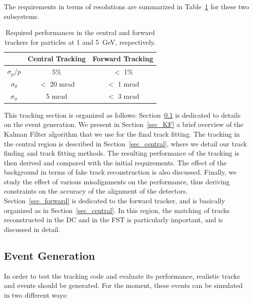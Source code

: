The requirements in terms of resolutions are summarized in 
Table~\ref{intro_requirements} for these two subsystems.

\begin{table}[ht!]
\centering
\begin{tabular}{|c|c|c|} \hline
                   & Central Tracking &  Forward Tracking \\ \hline
$\sigma_{p}/p$     & 5\%              &  $<$ 1\%     \\
$\sigma_{\theta}$  & $<$ 20 mrad      &  $<$ 1 mrad  \\
$\sigma_{\phi}$    & 5 mrad           &  $<$ 3 mrad  \\ \hline
\end{tabular}
\caption{\small{Required performances in the central and forward trackers for 
particles at 1 and 5~GeV, respectively.}}
\label{intro_requirements}
\end{table}

This tracking section is organized as follows: Section~\ref{sec_evtgener} is 
dedicated to details on the event generation.  We present in Section~\ref{sec_KF} 
a brief overview of the Kalman Filter algorithm that we use for the final track 
fitting.  The tracking in the central region is described in 
Section~\ref{sec_central}, where we detail our track finding and track fitting 
methods.  The resulting performance of the tracking is then derived and compared 
with the initial requirements. The effect of the background in terms of fake track 
reconstruction is also discussed.  Finally, we study the effect of various 
misalignments on the performance, thus deriving constraints on the accuracy of the 
alignment of the detectors.  Section~\ref{sec_forward} is dedicated to the forward 
tracker, and is basically organized as in Section~\ref{sec_central}.  In this region, 
the matching of tracks reconstructed in the DC and in the FST is particularly 
important, and is discussed in detail.

\subsection{Event Generation}
\label{sec_evtgener}

In order to test the tracking code and evaluate its performance, realistic tracks 
and events should be generated.  For the moment, these events can be simulated in 
two different ways:

